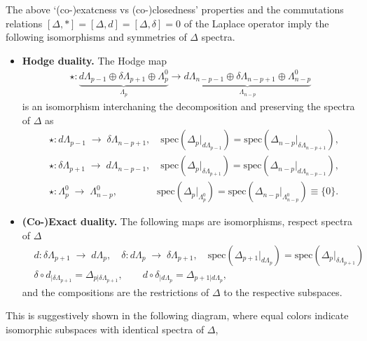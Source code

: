 \begin{mytheorem}
%
The above `(co-)exatcness vs (co-)closedness' properties and the commutations relations $[\Delta,*]=[\Delta,d]=[\Delta,\delta]=0$ of the Laplace operator imply the following isomorphisms and symmetries of $\Delta$ spectra.
\begin{itemize}
    \item \textbf{Hodge duality.} The Hodge map
    \begin{align}
        \star:\underbrace{d\Lambda_{p-1}\oplus \delta\Lambda_{p+1} \oplus \Lambda_p^0}_{\Lambda_p} \longrightarrow \underbrace{d\Lambda_{n-p-1}\oplus \delta\Lambda_{n-p+1} \oplus \Lambda_{n-p}^0}_{\Lambda_{n-p}}
    \end{align}
    is an isomorphism interchaning the decomposition and preserving the spectra of $\Delta$ as 
    \begin{align}
        &\star: d\Lambda_{p-1} \;\longrightarrow\; \delta\Lambda_{n-p+1},\quad \mathrm{spec}(\Delta_{p}|_{d\Lambda_{p-1}}) = \mathrm{spec}(\Delta_{n-p}|_{\delta\Lambda_{n-p+1}}),\\[6pt]
        &\star: \delta\Lambda_{p+1} \;\longrightarrow\; d\Lambda_{n-p-1},\quad \mathrm{spec}(\Delta_{p}|_{\delta\Lambda_{p+1}}) = \mathrm{spec}(\Delta_{n-p}|_{d\Lambda_{n-p-1}}),\\[6pt]
        &\star: \Lambda_p^0 \;\longrightarrow\; \Lambda_{n-p}^0, \qquad \qquad\mathrm{spec}(\Delta_p|_{\Lambda_p^0}) = \mathrm{spec}(\Delta_{n-p}|_{\Lambda_{n-p}^0})\equiv \{0\}.
    \end{align}
    \item \textbf{(Co-)Exact duality.} The following maps are isomorphisms, respect spectra of $\Delta$ 
    \begin{align}
        &d: \delta\Lambda_{p+1} \;\longrightarrow\; d\Lambda_{p},\quad
        \delta: d\Lambda_{p} \;\longrightarrow\; \delta\Lambda_{p+1}, \quad \mathrm{spec}(\Delta_{p+1}|_{d\Lambda_{p}}) = \mathrm{spec}(\Delta_p|_{\delta\Lambda_{p+1}})\\[7pt]
        &\delta\circ d_{|\delta\Lambda_{p+1}} = \Delta_{p|\delta\Lambda_{p+1}},\qquad d\circ \delta_{|d\Lambda_p} = \Delta_{p+1|d\Lambda_p},
    \end{align}
    and the compositions are the restrictions of $\Delta$ to the respective subspaces. 
\end{itemize}
%
This is suggestively shown in the following diagram, where equal colors indicate isomorphic subspaces with identical spectra of $\Delta$,


\end{mytheorem}
